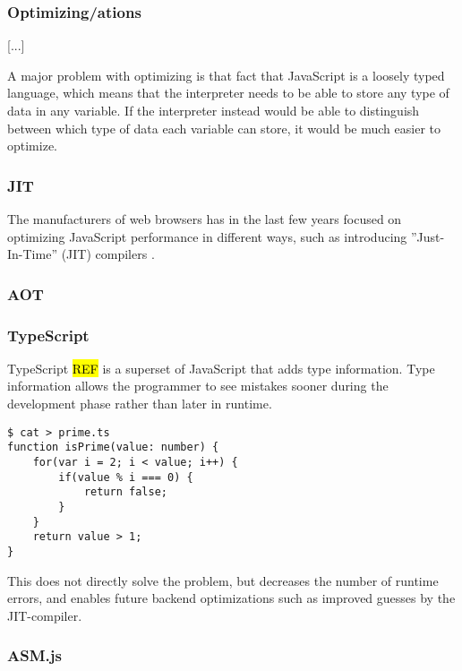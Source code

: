 \subsubsection{Optimizing/ations}

[...]

A major problem with optimizing is that fact that JavaScript is a loosely typed language, which means that the interpreter needs to be able to store any type of data in any variable. If the interpreter instead would be able to distinguish between which type of data each variable can store, it would be much easier to optimize.

\subsubsection{JIT}

The manufacturers of web browsers has in the last few years focused on optimizing JavaScript performance in different ways, such as introducing ''Just-In-Time'' (JIT) compilers \parencite{HerreraChenLavoieHendren2018}.

\subsubsection{AOT}



\subsubsection{TypeScript}

TypeScript \hl{REF} is a superset of JavaScript that adds type information. Type information allows the programmer to see mistakes sooner during the development phase rather than later in runtime.

\begin{verbatim}
$ cat > prime.ts
function isPrime(value: number) {
    for(var i = 2; i < value; i++) {
        if(value % i === 0) {
            return false;
        }
    }
    return value > 1;
}
\end{verbatim}

This does not directly solve the problem, but decreases the number of runtime errors, and enables future backend optimizations such as improved guesses by the JIT-compiler.

\subsubsection{ASM.js}

